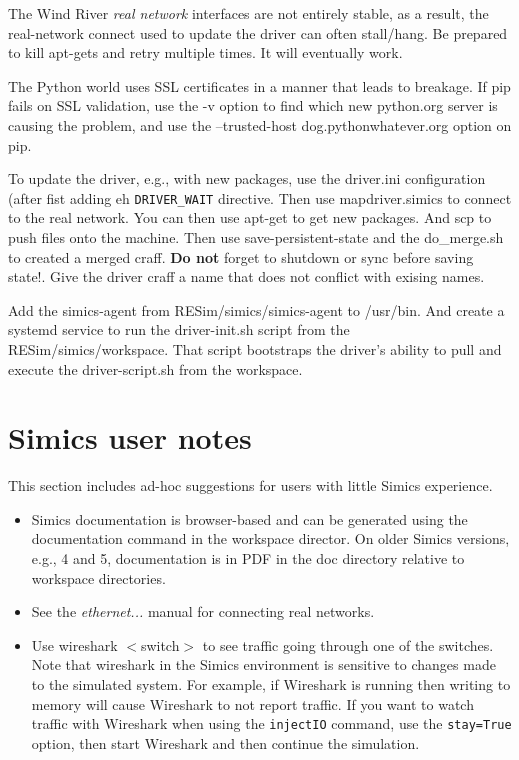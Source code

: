 \documentclass[titlepage]{article}
\begin{document}
\begin{appendices}
The Wind River \textit{real network} interfaces are not entirely stable, as a result, the real-network connect used to update the driver can often stall/hang.
Be prepared to kill apt-gets and retry multiple times.  It will eventually work.

The Python world uses SSL certificates in a manner that leads to breakage.  If pip fails on SSL validation, use the -v option
to find which new python.org server is causing the problem, and use the --trusted-host dog.pythonwhatever.org option on pip.

To update the driver, e.g., with new packages, use the driver.ini configuration (after fist adding eh {\tt DRIVER\_WAIT} directive.  Then use mapdriver.simics to connect to the real network.
You can then use apt-get to get new packages.  And scp to push files onto the machine.  Then use save-persistent-state and the do\_merge.sh to
created a merged craff.  \textbf{Do not} forget to shutdown or sync before saving state!.  Give the driver craff a name that does not conflict with exising names.

Add the simics-agent from RESim/simics/simics-agent to /usr/bin.  And create a systemd service to run the
driver-init.sh script from the RESim/simics/workspace.  That script bootstraps the driver's ability to pull
and execute the driver-script.sh from the workspace.

\section{Simics user notes}
This section includes ad-hoc suggestions for users with little Simics experience.
\begin{itemize}
\item Simics documentation is browser-based and can be generated using the documentation command in the workspace director.  On older Simics versions,
e.g., 4 and 5, documentation is in PDF in the doc directory relative to workspace directories.

\item See the \textit{ethernet...} manual for connecting real networks.

\item Use wireshark $<$switch$>$ to see traffic going through one of the switches. Note that wireshark in the Simics environment is sensitive to 
changes made to the simulated system.  For example, if Wireshark is running then writing to memory will cause Wireshark to not report traffic.  
If you want to watch traffic with Wireshark when using the {\tt injectIO} command, use the {\tt stay=True} option, then start Wireshark and then
continue the simulation.


\end{itemize}
\end{appendices}
\end{document}
